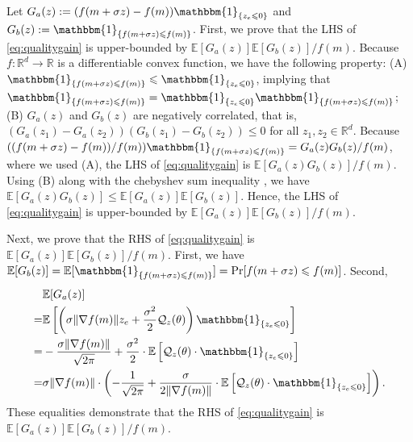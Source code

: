 \documentclass[journal]{IEEEtran}
\providecommand{\R}{\mathbb{R}} %
\providecommand{\E}{\mathbb{E}} %
\providecommand{\ind}[1]{\ensuremath{\mathbbm{1}_{\left\{#1\right\}}}} %
\renewcommand{\leq}{\leqslant} %
\DeclarePairedDelimiter{\norm}{\lVert}{\rVert}
\theoremstyle{definition}
\begin{document}
Let $G_a(z) := (f(m + \sigma z) - f(m) ) \ind{ z_e \leq 0}$ and $G_b(z) := \ind{f(m + \sigma z) \leq f(m)}$. 
First, we prove that the LHS of \eqref{eq:qualitygain} is upper-bounded by $\E[G_a(z)]\E[G_b(z)] / f(m)$.
Because $f: \R^d \to \R$ is a differentiable convex function, we have the following property: 
(A) $\ind{f(m + \sigma z) \leq f(m)} \leq \ind{ z_e \leq 0}$, implying that $\ind{f(m + \sigma z) \leq f(m)} = \ind{ z_e \leq 0}\ind{f(m + \sigma z) \leq f(m)}$;
(B) $G_a(z)$ and $G_b(z)$ are negatively correlated, that is, $(G_a(z_1) - G_a(z_2))(G_b(z_1) - G_b(z_2)) \leq 0$ for all $z_1, z_2 \in \R^d$.
Because $((f(m + \sigma z) - f(m)) / f(m)) \ind{f(m + \sigma z) \leq f(m)} = G_a(z) G_b(z) / f(m)$, where we used (A), the LHS of \eqref{eq:qualitygain} is  $\E[G_a(z) G_b(z)] / f(m)$.
Using (B) along with the chebyshev sum inequality \cite[Theorem 236]{hardy1952inequalities}, we have $\E[G_a(z)G_b(z)] \leq \E[G_a(z)]\E[G_b(z)]$. Hence, the LHS of \eqref{eq:qualitygain} is upper-bounded by $\E[G_a(z)]\E[G_b(z)] / f(m)$.

Next, we prove that the RHS of \eqref{eq:qualitygain} is $\E[G_a(z)]\E[G_b(z)] / f(m)$. 
First, we have $\E[G_b(z)] = \E[\ind{f(m + \sigma z) \leq f(m)}] = \Pr[f(m + \sigma z) \leq f(m)]$.
Second,
\begin{equation}
\begin{aligned}[t]
&\E[G_a(z)]
\\
=&
  \E\left[\left(\sigma \| \nabla f(m) \| z_e + \frac{\sigma^2 }{2} \mathcal{Q}_z(\theta) \right) \ind{z_e \leq 0}\right]
\\
=& - \frac{\sigma \| \nabla f(m) \|}{\sqrt{2\pi}} + \frac{\sigma^2}{2}\cdot\E\left[\mathcal{Q}_z(\theta) \cdot \ind{z_e \leq 0}\right]
\\
=& \sigma \norm{\nabla f(m)}\cdot\left(
- \frac{1}{\sqrt{2\pi}}
+ \frac{\sigma}{2\norm{\nabla f(m)}}\cdot\E\left[\mathcal{Q}_z(\theta) \cdot \ind{z_e \leq 0}\right]
\right)
  .
\end{aligned}
\end{equation}
These equalities demonstrate that the RHS of \eqref{eq:qualitygain} is $\E[G_a(z)]\E[G_b(z)] / f(m)$.
\end{document}
